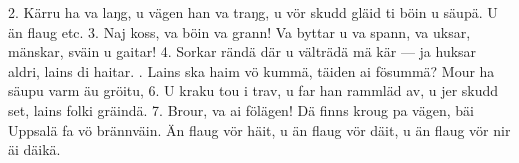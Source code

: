 \setlength{\columnsep}{0.2cm}
\begin{multicols}{2}
2.  Kärru ha va laŋg,
    u vägen han va traŋg,
    u vör skudd gläid ti böin u säupä.
    \qquad{}U än flaug etc.
3.  Naj koss, va böin va grann!
    Va byttar u va spann,
    va uksar, mänskar, sväin u gaitar!
4.  Sorkar rändä där
    u välträdä mä kär —
    ja huksar aldri, lains di haitar.
\vfill{}.  Lains ska haim vö kummä,
    täiden ai fösummä?
    Mour ha säupu varm äu gröitu,
6.  U kraku tou i trav,
    u far han rammläd av,
    u jer skudd set, lains folki gräindä.
7.  Brour, va ai fölägen!
    Dä finns kroug pa vägen,
    bäi Uppsalä fa vö brännväin.
    \qquad{}Än flaug vör häit,
    \qquad{}u än flaug vör däit,
    \qquad{}u än flaug vör nir äi däikä.
\end{multicols}
